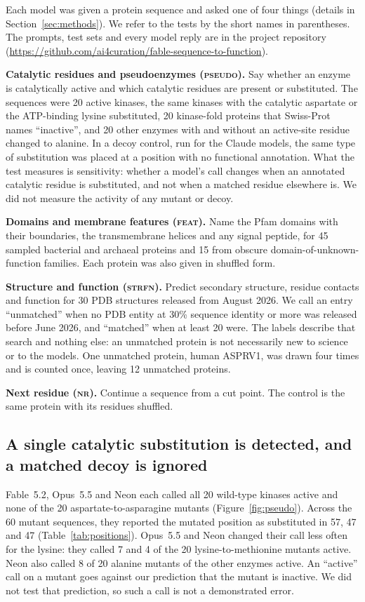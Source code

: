 \documentclass[11pt]{article}
\newcommand{\tnr}{\textmd{\textsc{nr}}}\newcommand{\tfeat}{\textmd{\textsc{feat}}}
\newcommand{\tpseudo}{\textmd{\textsc{pseudo}}}\newcommand{\tstrfn}{\textmd{\textsc{strfn}}}
\begin{document}
Each model was given a protein sequence and asked one of four things (details in
Section~\ref{sec:methods}). We refer to the tests by the short names in parentheses. The prompts, test sets and every
model reply are in the project repository (\url{https://github.com/ai4curation/fable-sequence-to-function}).

\textbf{Catalytic residues and pseudoenzymes (\tpseudo).} Say whether an enzyme is catalytically active and which catalytic
residues are present or substituted. The sequences were 20 active kinases, the same kinases with the
catalytic aspartate or the ATP-binding lysine substituted, 20 kinase-fold proteins that Swiss-Prot names
``inactive'', and 20 other enzymes with and without an active-site residue changed to alanine. In a decoy
control, run for the Claude models, the same type of substitution was placed at a position with no
functional annotation. What the test measures is sensitivity: whether a model's call changes when an
annotated catalytic residue is substituted, and not when a matched residue elsewhere is. We did not
measure the activity of any mutant or decoy.

\textbf{Domains and membrane features (\tfeat).} Name the Pfam domains with their boundaries, the
transmembrane helices and any signal peptide, for 45 sampled bacterial and archaeal proteins and 15 from
obscure domain-of-unknown-function families. Each protein was also given in shuffled form.

\textbf{Structure and function (\tstrfn).} Predict secondary structure, residue contacts and function for
30 PDB structures released from August 2026. We call an entry ``unmatched'' when no PDB entity at 30\%
sequence identity or more was released before June 2026, and ``matched'' when at least 20 were. The labels
describe that search and nothing else: an unmatched protein is not necessarily new to science or to the
models. One unmatched protein, human ASPRV1, was drawn four times and is counted once, leaving 12
unmatched proteins.

\textbf{Next residue (\tnr).} Continue a sequence from a cut point. The control is the same protein with
its residues shuffled.

\subsection{A single catalytic substitution is detected, and a matched decoy is ignored}

Fable~5.2, Opus~5.5 and Neon each called all 20 wild-type kinases active and none of the 20
aspartate-to-asparagine mutants (Figure~\ref{fig:pseudo}). Across the 60 mutant sequences, they reported
the mutated position as substituted in 57, 47 and 47 (Table~\ref{tab:positions}). Opus~5.5 and Neon
changed their call less often for the lysine: they called 7 and 4 of the 20 lysine-to-methionine mutants active. Neon
also called 8 of 20 alanine mutants of the other enzymes active. An ``active'' call on a mutant goes
against our prediction that the mutant is inactive. We did not test that prediction, so such a call is
not a demonstrated error.
\end{document}
